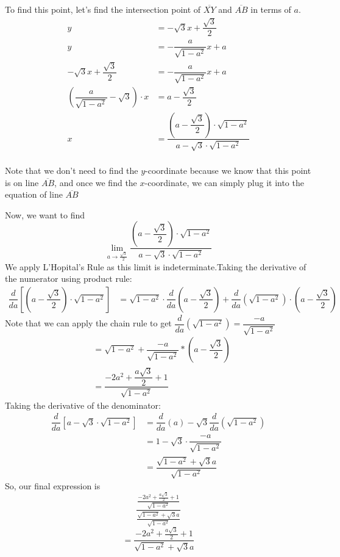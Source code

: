 \begin{enumerate}
 To find this point, let's find the intersection point of $\overline{XY}$ and $\overline{AB}$ in terms of $a$. \begin{align*}y &= -\sqrt{3} x + \dfrac{\sqrt{3}}{2} \\y &= -\dfrac{a}{\sqrt{1-a^2}}x + a \\-\sqrt{3} x + \dfrac{\sqrt{3}}{2} &= -\dfrac{a}{\sqrt{1-a^2}}x + a \\(\dfrac{a}{\sqrt{1-a^2}} - \sqrt{3}) \cdot x &= a-\dfrac{\sqrt{3}}{2} \\x &= \dfrac{(a-\dfrac{\sqrt{3}}{2})\cdot\sqrt{1-a^2}}{a - \sqrt{3} \cdot \sqrt{1-a^2}} \\ \end{align*}


 Note that we don't need to find the $y$-coordinate because we know that this point is on line $\overline{AB}$, and once we find the $x$-coordinate, we can simply plug it into the equation of line $\overline{AB}$

 Now, we want to find 
 \[ \lim_{a\to\frac{\sqrt{3}}{2}} \dfrac{(a-\dfrac{\sqrt{3}}{2})\cdot\sqrt{1-a^2}}{a - \sqrt{3} \cdot \sqrt{1-a^2}} \]We apply L'Hopital's Rule as this limit is indeterminate.Taking the derivative of the numerator using product rule:\begin{align*}\dfrac{d}{da} \left[(a-\dfrac{\sqrt{3}}{2})\cdot\sqrt{1-a^2}\right] &= \sqrt{1-a^2} \cdot \dfrac{d}{da} \left(a-\dfrac{\sqrt{3}}{2}\right) + \dfrac{d}{da} \left(\sqrt{1-a^2}\right) \cdot (a-\dfrac{\sqrt{3}}{2})\end{align*}
Note that we can apply the chain rule to get $\dfrac{d}{da} \left(\sqrt{1-a^2}\right) = \dfrac{-a}{\sqrt{1-a^2}}$\begin{align*}&= \sqrt{1-a^2} + \dfrac{-a}{\sqrt{1-a^2}} * (a-\dfrac{\sqrt{3}}{2}) \\&= \dfrac{-2a^2 + \dfrac{a\sqrt{3}}{2} + 1}{\sqrt{1-a^2}}\end{align*}
Taking the derivative of the denominator:\begin{align*}\dfrac{d}{da} \left[a-\sqrt{3}\cdot\sqrt{1-a^2}\right] &= \dfrac{d}{da} (a) - \sqrt{3}\dfrac{d}{da}(\sqrt{1-a^2}) \\&= 1 - \sqrt{3}\cdot\dfrac{-a}{\sqrt{1-a^2}} \\&= \dfrac{\sqrt{1-a^2} + \sqrt{3}a}{\sqrt{1-a^2}}\end{align*}
So, our final expression is 
 \[ \dfrac{\frac{-2a^2 + \frac{a\sqrt{3}}{2} + 1}{\sqrt{1-a^2}}}{\frac{\sqrt{1-a^2} + \sqrt{3}a}{\sqrt{1-a^2}}}  \]
 \[ = \dfrac{-2a^2 + \frac{a\sqrt{3}}{2} + 1}{\sqrt{1-a^2} + \sqrt{3}a} \]


\end{enumerate}
